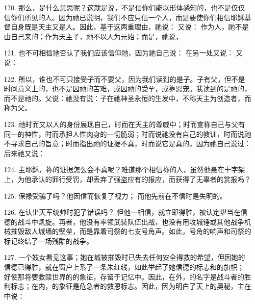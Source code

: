 120. 那么，是什么意思呢？这就是说，不是信你们能以形体感知的，也不是仅仅信你们所见的人。因为祂已说明，我们不应只信一个人，而是要使你们相信耶稣基督自身既是天主又是人。因此，基于这两重理由，祂说：  又说：  作为人，祂不是由自己来的；作为天主子，祂不以人为元始；而是，祂说，\par

121. 也不可相信祂否认了我们应该信仰祂，因为祂自己说：  在另一处又说：  又说： \par

122. 所以，谁也不可只接受子而不要父，因为我们读到的是子。子有父，但不是时间意义上的，也不是因祂的苦难，或因祂的受孕，或靠恩宠。我读到的是祂的，而不是祂的。父说：祂没有说：子在祂神圣永恒的生发中，不称天主为创造者，而称为父。\par

123. 祂时而又以人的身份展现自己，时而在天主的尊威中；时而宣称自己与父有同一的神性，时而承担人性肉身的一切脆弱；时而说祂没有自己的教训，时而说祂不寻求自己的旨意；时而指出祂的证据不真，时而说它是真的。因为祂自己说过：  后来祂又说： \par

124. 主耶稣，祢的证据怎么会不真呢？难道那个相信祢的人，虽然他悬在十字架上，为他承认的罪行受罚，却丢弃了强盗应有的报应，而获得了无辜者的赏报吗？\par

125. 保禄受骗了吗？他因信而恢复了视力； 而他先前在不信时是失明的。\par

126. 在认出天军统帅时犯了错误吗？ 但他一相信，就立即得胜，被认定堪当在信德的战斗中凯旋。再者，他没有率领武装队伍出战，也没有用攻城锤或其他战争机械摧毁敌人城墙的壁垒，而是靠着司祭的七支号角声。如此，号角的响声和司祭的标记终结了一场残酷的战争。\par

127. 一个妓女看见这事；她在城被摧毁时已失去任何安全得救的希望，但因她的信德已得胜，就在窗户上系了一条朱红线，如此举起了她信德的标志和的旗帜； 好使那将要救赎世界的的象征，存留于记忆中。因此，在外，的名字是战斗者的胜利标志；在内，的象征是危急者的救恩标志。因此，因为明白了天上的奥秘，主在中说：\par

